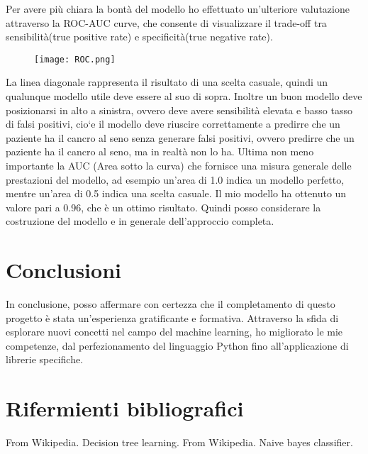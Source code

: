\documentclass{article}
\begin{document}
Per avere più chiara la bontà del modello ho effettuato un’ulteriore valutazione attraverso la ROC-AUC curve, che consente di visualizzare il trade-off tra sensibilità(true positive rate) e specificità(true negative rate).
\begin{figure}[h]
  \centering
  \texttt{[image: ROC.png]}
  \label{fig:esempio}
\end{figure}


La linea diagonale rappresenta il risultato di una scelta casuale, quindi un qualunque modello utile deve essere al suo di sopra. Inoltre un buon modello deve posizionarsi in alto a sinistra, ovvero deve avere sensibilità elevata e basso tasso di falsi positivi, cio`e il modello deve riuscire  correttamente a predirre che un paziente ha il cancro al seno senza generare falsi positivi, ovvero predirre che un paziente ha il cancro al seno, ma in realtà non lo ha. Ultima non meno importante la AUC (Area sotto la curva) che fornisce una misura generale delle prestazioni del modello, ad esempio un’area di 1.0 indica un modello perfetto, mentre un’area di 0.5 indica una scelta casuale. Il mio modello ha ottenuto un valore pari a 0.96, che è un ottimo risultato. Quindi posso considerare la costruzione del modello e in generale dell’approccio completa.


\section{Conclusioni}
In conclusione, posso affermare con certezza che il completamento di questo progetto è stata un'esperienza gratificante e formativa. Attraverso la sfida di esplorare nuovi concetti nel campo del machine learning, ho migliorato le mie competenze, dal perfezionamento del linguaggio Python fino all'applicazione di librerie specifiche.

\section{Rifermienti bibliografici}
From Wikipedia. Decision tree learning.
From Wikipedia. Naive bayes classifier.
\end{document}
